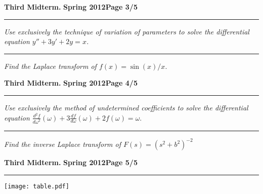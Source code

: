 \documentclass[12pt]{article}
\begin{document}
\newpage
\hfill{\large\bf Third Midterm.}\hfill{\large\bf
  Spring 2012}\hfill{\large\bf Page 3/5}\hrule

\bigskip
{\problem[20 pts] \em Use exclusively the technique of variation of
  parameters to solve the differential equation $y''+3y'+2y=x$.}
\vspace{14cm}
\begin{flushright}
\end{flushright}
\hrule
{\problem[10pts] \em Find the Laplace transform of $f(x)=\sin(x)/x.$}
\vspace{4cm}
\begin{flushright}
\end{flushright}
\newpage

\hfill{\large\bf Third Midterm.}\hfill{\large\bf
  Spring 2012}\hfill{\large\bf Page 4/5}\hrule

\bigskip
{\problem[15 pts] \em Use exclusively the method of undetermined
  coefficients to solve the differential equation $\frac{d^2
    f}{d\omega^2}(\omega) + 3\frac{df}{d\omega}(\omega) + 2f(\omega) =
  \omega.$}
\vspace{6cm}
\begin{flushright}
\end{flushright}
\hrule
{\problem[20] \em Find the inverse Laplace transform of
  $F(s)=(s^2+b^2)^{-2}$}
\vspace{11.5cm}
\begin{flushright}
\end{flushright}
\newpage

\hfill{\large\bf Third Midterm.}\hfill{\large\bf
  Spring 2012}\hfill{\large\bf Page 5/5}\hrule

\bigskip
\begin{center}
\texttt{[image: table.pdf]}
\end{center}
\end{document}
